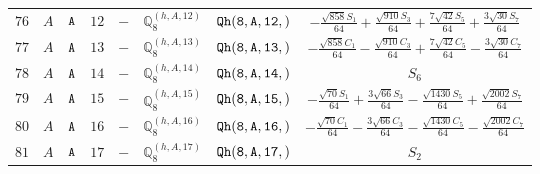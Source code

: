 \documentclass[fleqn,8pt]{jsarticle}
\begin{document}
\begin{table}[ht!]
\begin{center}
\begin{tabular}{cccccccc}
$ 76 $ & $ A $ & $ {\tt A} $ & $ 12 $ & $ - $ & $ \mathbb{Q}_{8}^{(h,A,12)} $ & $ {\tt Qh(8,A,12,)} $ & $ - \frac{\sqrt{858} S_{1}}{64} + \frac{\sqrt{910} S_{3}}{64} + \frac{7 \sqrt{42} S_{5}}{64} + \frac{3 \sqrt{30} S_{7}}{64} $ \\
$ 77 $ & $ A $ & $ {\tt A} $ & $ 13 $ & $ - $ & $ \mathbb{Q}_{8}^{(h,A,13)} $ & $ {\tt Qh(8,A,13,)} $ & $ - \frac{\sqrt{858} C_{1}}{64} - \frac{\sqrt{910} C_{3}}{64} + \frac{7 \sqrt{42} C_{5}}{64} - \frac{3 \sqrt{30} C_{7}}{64} $ \\
$ 78 $ & $ A $ & $ {\tt A} $ & $ 14 $ & $ - $ & $ \mathbb{Q}_{8}^{(h,A,14)} $ & $ {\tt Qh(8,A,14,)} $ & $ S_{6} $ \\
$ 79 $ & $ A $ & $ {\tt A} $ & $ 15 $ & $ - $ & $ \mathbb{Q}_{8}^{(h,A,15)} $ & $ {\tt Qh(8,A,15,)} $ & $ - \frac{\sqrt{70} S_{1}}{64} + \frac{3 \sqrt{66} S_{3}}{64} - \frac{\sqrt{1430} S_{5}}{64} + \frac{\sqrt{2002} S_{7}}{64} $ \\
$ 80 $ & $ A $ & $ {\tt A} $ & $ 16 $ & $ - $ & $ \mathbb{Q}_{8}^{(h,A,16)} $ & $ {\tt Qh(8,A,16,)} $ & $ - \frac{\sqrt{70} C_{1}}{64} - \frac{3 \sqrt{66} C_{3}}{64} - \frac{\sqrt{1430} C_{5}}{64} - \frac{\sqrt{2002} C_{7}}{64} $ \\
$ 81 $ & $ A $ & $ {\tt A} $ & $ 17 $ & $ - $ & $ \mathbb{Q}_{8}^{(h,A,17)} $ & $ {\tt Qh(8,A,17,)} $ & $ S_{2} $ \\
 \hline \hline
\end{tabular}
\end{center}
\end{table}
\end{document}
